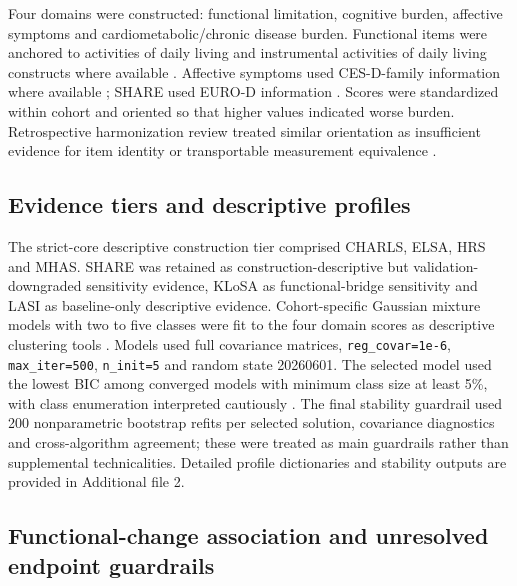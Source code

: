 \documentclass[pdflatex,sn-vancouver-num]{sn-jnl}
\begin{document}
Four domains were constructed: functional limitation, cognitive burden, affective symptoms and cardiometabolic/chronic disease burden. Functional items were anchored to activities of daily living and instrumental activities of daily living constructs where available \cite{katz1963adl,lawton1969iadl}. Affective symptoms used CES-D-family information where available \cite{radloff1977cesd}; SHARE used EURO-D information \cite{prince1999eurod}. Scores were standardized within cohort and oriented so that higher values indicated worse burden. Retrospective harmonization review treated similar orientation as insufficient evidence for item identity or transportable measurement equivalence \cite{doiron2013bioshare,fortier2017maelstrom}.

\subsection{Evidence tiers and descriptive profiles}

The strict-core descriptive construction tier comprised CHARLS, ELSA, HRS and MHAS. SHARE was retained as construction-descriptive but validation-downgraded sensitivity evidence, KLoSA as functional-bridge sensitivity and LASI as baseline-only descriptive evidence. Cohort-specific Gaussian mixture models with two to five classes were fit to the four domain scores as descriptive clustering tools \cite{mclachlan2000finite}. Models used full covariance matrices, \texttt{reg\_covar=1e-6}, \texttt{max\_iter=500}, \texttt{n\_init=5} and random state 20260601. The selected model used the lowest BIC among converged models with minimum class size at least 5\%, with class enumeration interpreted cautiously \cite{nylund2007classes,hennig2015trueclusters}. The final stability guardrail used 200 nonparametric bootstrap refits per selected solution, covariance diagnostics and cross-algorithm agreement; these were treated as main guardrails rather than supplemental technicalities. Detailed profile dictionaries and stability outputs are provided in Additional file 2.

\subsection{Functional-change association and unresolved endpoint guardrails}
\end{document}
